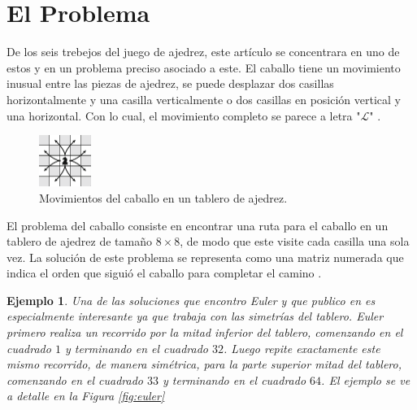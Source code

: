 \documentclass[journal, 10pt]{IEEEtran}
\newtheorem{example}{Ejemplo}
\begin{document}

\section{El Problema}
De los seis trebejos del juego de ajedrez, este art\'iculo se concentrara en uno de estos y en un problema preciso asociado a este. El caballo tiene un movimiento inusual entre las piezas de ajedrez, se puede desplazar dos casillas horizontalmente y una casilla verticalmente o dos casillas en posición vertical y una horizontal. Con lo cual, el movimiento completo se parece a letra "$\mathcal{L}$"  \cite{Uehara:2019}.

\begin{figure}[h]

\centering
\includegraphics[width=0.15\textwidth]{figures/k_moves.png}
\caption{Movimientos del caballo en un tablero de ajedrez.}
\label{fig:moves}

\end{figure}

El problema del caballo consiste en encontrar una ruta para el caballo en un tablero de ajedrez de tamaño $8 \times 8$, de modo que este visite cada casilla una sola vez. La soluci\'on de este problema se representa como una matriz numerada que indica el orden que sigui\'o el caballo para completar el camino \cite{Kopec:2016}.

\begin{example}
	Una de las soluciones que encontro Euler y que publico en \cite{Euler:1759} es especialmente interesante ya que trabaja con las simetr\'ias del tablero. Euler primero realiza un recorrido  por la mitad inferior del tablero, comenzando en el cuadrado $1$ y terminando en el cuadrado $32$. Luego repite exactamente este mismo recorrido, de manera sim\'etrica, para la parte superior mitad del tablero, comenzando en el cuadrado $33$ y terminando en el cuadrado $64$. El ejemplo se ve a detalle en la \textit{Figura \ref{fig:euler}} 
\end{example}
\end{document}
